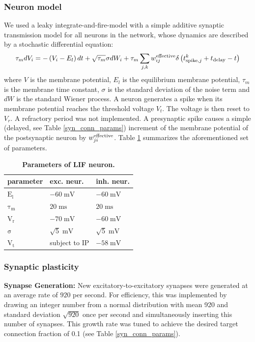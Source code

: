 \documentclass[10pt,letterpaper]{article}
\begin{document}
\subsubsection*{Neuron model}
We used a leaky integrate-and-fire-model with a simple additive synaptic transmission model for all neurons in the network, whose dynamics are described by a stochastic differential equation:
\begin{equation}
{\tau_m}dV_i = -\left( V_i-E_l \right) dt + \sqrt{\tau_m} \sigma dW_i + \tau_m \sum_{j,k} w^{\rm effective}_{ij}\delta \left( t^k_{\mathrm{spike},j} + t_{\rm delay} - t \right)
\label{LIF_Dynamics}
\end{equation}
where $V$ is the membrane potential, $E_l$ is the equilibrium membrane potential, $\tau_m$ is the membrane time constant, $\sigma$ is the standard deviation of the noise term and $dW$ is the standard Wiener process. A neuron generates a spike when its membrane potential reaches the threshold voltage $V_t$. The voltage is then reset to $V_r$. A refractory period was not implemented. A presynaptic spike causes a simple (delayed, see Table \ref{syn_conn_params}) increment of the membrane potential of the postsynaptic neuron by $w^{\rm effective}_{ji}$. Table \ref{LIF_neuron_params} summarizes the aforementioned set of parameters.
\begin{table}
\caption{\bf Parameters of LIF neuron.}
\begin{tabular}{|l|l|l|}
\hline
\textbf{parameter} & \textbf{exc. neur.} & \textbf{inh. neur.}\\ \hline
$\mathrm{E_l}$ & $\mathrm{-60\;mV}$ & $\mathrm{-60\;mV}$ \\ \hline
$\mathrm{\tau_m}$ & $\mathrm{20\;ms}$ & $\mathrm{20\;ms}$ \\ \hline
$\mathrm{V_r}$ & $\mathrm{-70\;mV}$ & $\mathrm{-60\;mV}$ \\ \hline
$\mathrm{\sigma}$ & $\mathrm{\sqrt{5}\;mV}$ & $\mathrm{\sqrt{5}\;mV}$ \\ \hline
$\mathrm{V_t}$ & subject to IP & $\mathrm{-58\;mV}$ \\ 
\hline
\end{tabular}
\label{LIF_neuron_params}
\end{table}


\subsubsection*{Synaptic plasticity}\label{Section_Methods_Syn_Plast}
\textbf{Synapse Generation:} New excitatory-to-excitatory synapses were generated at an average rate of $920$ per second. For efficiency, this was implemented by drawing an integer number from a normal distribution with mean 920 and standard deviation $\sqrt{920}$ once per second and simultaneously inserting this number of synapses. This growth rate was tuned to achieve the desired target connection fraction of 0.1 (see Table \ref{syn_conn_params}).
\end{document}
